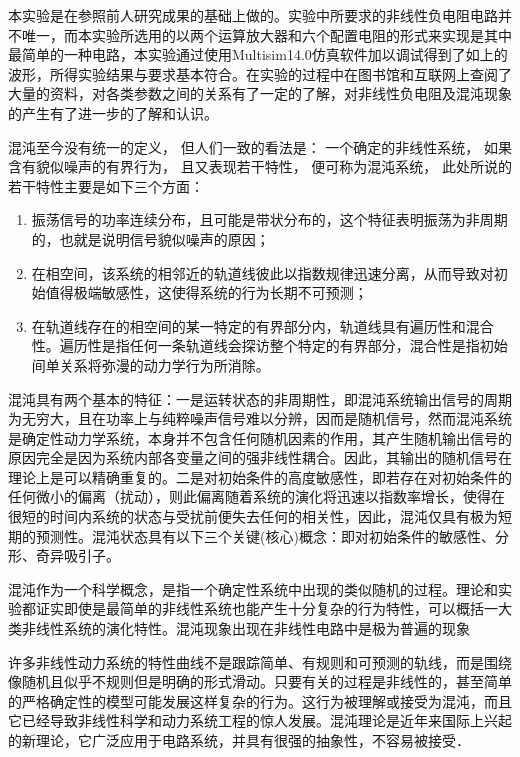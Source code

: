 \documentclass{article}
\begin{document}
本实验是在参照前人研究成果的基础上做的。实验中所要求的非线性负电阻电路并不唯一，而本实验所选用的以两个运算放大器和六个配置电阻的形式来实现是其中最简单的一种电路，本实验通过使用Multisim14.0仿真软件加以调试得到了如上的波形，所得实验结果与要求基本符合。在实验的过程中在图书馆和互联网上查阅了大量的资料，对各类参数之间的关系有了一定的了解，对非线性负电阻及混沌现象的产生有了进一步的了解和认识。

混沌至今没有统一的定义， 但人们一致的看法是： 一个确定的非线性系统， 如果含有貌似噪声的有界行为， 且又表现若干特性， 便可称为混沌系统， 此处所说的若干特性主要是如下三个方面：

\begin{enumerate}
	\item 振荡信号的功率连续分布，且可能是带状分布的，这个特征表明振荡为非周期的，也就是说明信号貌似噪声的原因；
	\item 在相空间，该系统的相邻近的轨道线彼此以指数规律迅速分离，从而导致对初始值得极端敏感性，这使得系统的行为长期不可预测；
	\item 在轨道线存在的相空间的某一特定的有界部分内，轨道线具有遍历性和混合性。遍历性是指任何一条轨道线会探访整个特定的有界部分，混合性是指初始间单关系将弥漫的动力学行为所消除。
\end{enumerate}

混沌具有两个基本的特征：一是运转状态的非周期性，即混沌系统输出信号的周期为无穷大，且在功率上与纯粹噪声信号难以分辨，因而是随机信号，然而混沌系统是确定性动力学系统，本身并不包含任何随机因素的作用，其产生随机输出信号的原因完全是因为系统内部各变量之间的强非线性耦合。因此，其输出的随机信号在理论上是可以精确重复的。二是对初始条件的高度敏感性，即若存在对初始条件的任何微小的偏离（扰动），则此偏离随着系统的演化将迅速以指数率增长，使得在很短的时间内系统的状态与受扰前便失去任何的相关性，因此，混沌仅具有极为短期的预测性。混沌状态具有以下三个关键(核心)概念：即对初始条件的敏感性、分形、奇异吸引子。

混沌作为一个科学概念，是指一个确定性系统中出现的类似随机的过程。理论和实验都证实即使是最简单的非线性系统也能产生十分复杂的行为特性，可以概括一大类非线性系统的演化特性。混沌现象出现在非线性电路中是极为普遍的现象

许多非线性动力系统的特性曲线不是跟踪简单、有规则和可预测的轨线，而是围绕像随机且似乎不规则但是明确的形式滑动。只要有关的过程是非线性的，甚至简单的严格确定性的模型可能发展这样复杂的行为。这行为被理解或接受为混沌，而且它已经导致非线性科学和动力系统工程的惊人发展。混沌理论是近年来国际上兴起的新理论，它广泛应用于电路系统，并具有很强的抽象性，不容易被接受．
\end{document}
